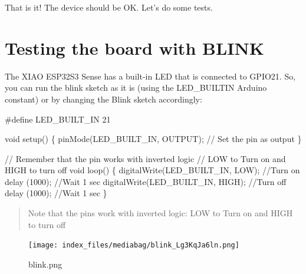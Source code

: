 \documentclass[
  letterpaper,
  DIV=11,
  numbers=noendperiod]{scrreprt}
\newenvironment{Shaded}{\begin{snugshade}}{\end{snugshade}}
\newcommand{\CommentTok}[1]{\textcolor[rgb]{0.37,0.37,0.37}{#1}}
\newcommand{\DataTypeTok}[1]{\textcolor[rgb]{0.68,0.00,0.00}{#1}}
\newcommand{\DecValTok}[1]{\textcolor[rgb]{0.68,0.00,0.00}{#1}}
\newcommand{\NormalTok}[1]{\textcolor[rgb]{0.00,0.23,0.31}{#1}}
\newcommand{\OperatorTok}[1]{\textcolor[rgb]{0.37,0.37,0.37}{#1}}
\newcommand{\PreprocessorTok}[1]{\textcolor[rgb]{0.68,0.00,0.00}{#1}}
\begin{document}
That is it! The device should be OK. Let's do some tests.

\hypertarget{testing-the-board-with-blink}{%
\section*{Testing the board with
BLINK}\label{testing-the-board-with-blink}}


The XIAO ESP32S3 Sense has a built-in LED that is connected to GPIO21.
So, you can run the blink sketch as it is (using the LED\_BUILTIN
Arduino constant) or by changing the Blink sketch accordingly:

\begin{Shaded}
\begin{Highlighting}[]
\PreprocessorTok{\#define LED\_BUILT\_IN }\DecValTok{21}\PreprocessorTok{ }

\DataTypeTok{void}\NormalTok{ setup}\OperatorTok{()} \OperatorTok{\{}
\NormalTok{  pinMode}\OperatorTok{(}\NormalTok{LED\_BUILT\_IN}\OperatorTok{,}\NormalTok{ OUTPUT}\OperatorTok{);} \CommentTok{// Set the pin as output}
\OperatorTok{\}}

\CommentTok{// Remember that the pin works with inverted logic}
\CommentTok{// LOW to Turn on and HIGH to turn off}
\DataTypeTok{void}\NormalTok{ loop}\OperatorTok{()} \OperatorTok{\{}
\NormalTok{  digitalWrite}\OperatorTok{(}\NormalTok{LED\_BUILT\_IN}\OperatorTok{,}\NormalTok{ LOW}\OperatorTok{);} \CommentTok{//Turn on}
\NormalTok{  delay }\OperatorTok{(}\DecValTok{1000}\OperatorTok{);} \CommentTok{//Wait 1 sec}
\NormalTok{  digitalWrite}\OperatorTok{(}\NormalTok{LED\_BUILT\_IN}\OperatorTok{,}\NormalTok{ HIGH}\OperatorTok{);} \CommentTok{//Turn off}
\NormalTok{  delay }\OperatorTok{(}\DecValTok{1000}\OperatorTok{);} \CommentTok{//Wait 1 sec}
\OperatorTok{\}}
\end{Highlighting}
\end{Shaded}

\begin{quote}
Note that the pins work with inverted logic: LOW to Turn on and HIGH to
turn off
\end{quote}

\begin{figure}[H]

{\centering \texttt{[image: index\_files/mediabag/blink\_Lg3KqJa6ln.png]}

}

\caption{blink.png}

\end{figure}
\end{document}

